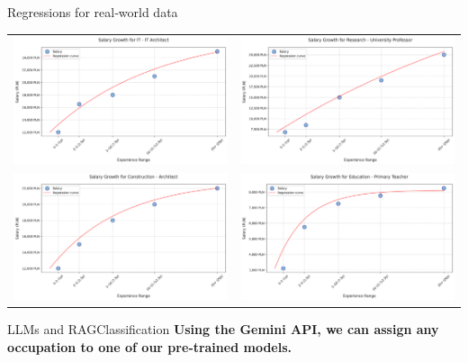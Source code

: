 \begin{frame}[t]{Regressions for real‑world data}
\centering
\begin{tabular}{cc}
    \pause
\includegraphics[width=0.45\linewidth]{img/salary_progression2} &
    \pause
\includegraphics[width=0.45\linewidth]{img/salary_progression4} \\
    \pause
\includegraphics[width=0.45\linewidth]{img/salary_progression6} &
    \pause
\includegraphics[width=0.45\linewidth]{img/salary_progression7}
\end{tabular}
\end{frame}

\begin{frame}[t]{LLMs and RAG}{Classification}
    \textbf{Using the Gemini API, we can assign any occupation to one of our pre‑trained models.}
    \\
    \pause
    \\
    \pause
\end{frame}
